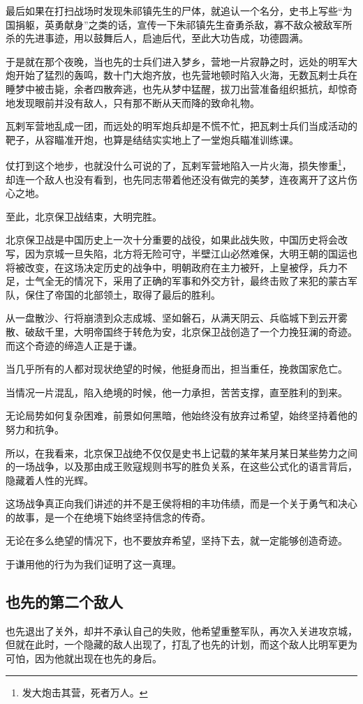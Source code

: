 \begin{multicols}{\theparacolNo}
最后如果在打扫战场时发现朱祁镇先生的尸体，就追认一个名分，史书上写些“为国捐躯，英勇献身”之类的话，宣传一下朱祁镇先生奋勇杀敌，寡不敌众被敌军所杀的先进事迹，用以鼓舞后人，启迪后代，至此大功告成，功德圆满。

于是就在那个夜晚，当也先的士兵们进入梦乡，营地一片寂静之时，远处的明军大炮开始了猛烈的轰鸣，数十门大炮齐放，也先营地顿时陷入火海，无数瓦剌士兵在睡梦中被击毙，余者四散奔逃，也先从梦中猛醒，拔刀出营准备组织抵抗，却惊奇地发现眼前并没有敌人，只有那不断从天而降的致命礼物。

瓦剌军营地乱成一团，而远处的明军炮兵却是不慌不忙，把瓦剌士兵们当成活动的靶子，从容瞄准开炮，也算是结结实实地上了一堂炮兵瞄准训练课。

仗打到这个地步，也就没什么可说的了，瓦剌军营地陷入一片火海，损失惨重\footnote{发大炮击其营，死者万人。}，却连一个敌人也没有看到，也先同志带着他还没有做完的美梦，连夜离开了这片伤心之地。

至此，北京保卫战结束，大明完胜。

北京保卫战是中国历史上一次十分重要的战役，如果此战失败，中国历史将会改写，因为京城一旦失陷，北方将无险可守，半壁江山必然难保，大明王朝的国运也将被改变，在这场决定历史的战争中，明朝政府在主力被歼，上皇被俘，兵力不足，士气全无的情况下，采用了正确的军事和外交方针，最终击败了来犯的蒙古军队，保住了帝国的北部领土，取得了最后的胜利。

从一盘散沙、行将崩溃到众志成城、坚如磐石，从满天阴云、兵临城下到云开雾散、破敌千里，大明帝国终于转危为安，北京保卫战创造了一个力挽狂澜的奇迹。而这个奇迹的缔造人正是于谦。

当几乎所有的人都对现状绝望的时候，他挺身而出，担当重任，挽救国家危亡。

当情况一片混乱，陷入绝境的时候，他一力承担，苦苦支撑，直至胜利的到来。

无论局势如何复杂困难，前景如何黑暗，他始终没有放弃过希望，始终坚持着他的努力和抗争。

所以，在我看来，北京保卫战绝不仅仅是史书上记载的某年某月某日某些势力之间的一场战争，以及那由成王败寇规则书写的胜负关系，在这些公式化的语言背后，隐藏着人性的光辉。

这场战争真正向我们讲述的并不是王侯将相的丰功伟绩，而是一个关于勇气和决心的故事，是一个在绝境下始终坚持信念的传奇。

无论在多么绝望的情况下，也不要放弃希望，坚持下去，就一定能够创造奇迹。

于谦用他的行为为我们证明了这一真理。

\subsection{也先的第二个敌人}
也先退出了关外，却并不承认自己的失败，他希望重整军队，再次入关进攻京城，但就在此时，一个隐藏的敌人出现了，打乱了也先的计划，而这个敌人比明军更为可怕，因为他就出现在也先的身后。


\end{multicols}

